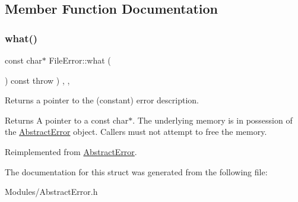 \subsection{Member Function Documentation}
\mbox{\label{structFileError_a7446417295daef00459e8d7e16cbb151}} 
\subsubsection{\texorpdfstring{what()}{what()}}
{\footnotesize\ttfamily const char$\ast$ File\+Error\+::what (\begin{DoxyParamCaption}{ }\end{DoxyParamCaption}) const throw  ) \hspace{0.3cm}{\ttfamily [inline]}, {\ttfamily [override]}, {\ttfamily [virtual]}}

Returns a pointer to the (constant) error description. \begin{DoxyReturn}{Returns}
A pointer to a const char$\ast$. The underlying memory is in possession of the \hyperlink{classAbstractError}{Abstract\+Error} object. Callers must not attempt to free the memory. 
\end{DoxyReturn}


Reimplemented from \hyperlink{classAbstractError_a19735c7a9b5f6e84db606292967667a9}{Abstract\+Error}.



The documentation for this struct was generated from the following file\+:\begin{DoxyCompactItemize}
\item 
Modules/Abstract\+Error.\+h\end{DoxyCompactItemize}
